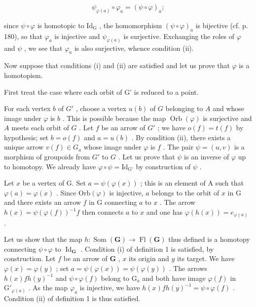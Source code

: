 \[
\psi_ {\varphi (a)} \circ \varphi_ {a} = (\psi \circ \varphi) _ {a};
\]

since \(\psi \circ \varphi\) is homotopic to \(\mathrm{Id}_{\mathrm{G}}\) , the homomorphism \((\psi \circ \varphi)_a\) is bijective (cf. p. 180), so that \(\varphi_a\) is injective and \(\psi_{\varphi(a)}\) is surjective. Exchanging the roles of \(\varphi\) and \(\psi\) , we see that \(\varphi_a\) is also surjective, whence condition (ii).

Now suppose that conditions (i) and (ii) are satisfied and let us prove that \(\varphi\) is a homotopism.

First treat the case where each orbit of G' is reduced to a point.

For each vertex \(b\) of \(G'\) , choose a vertex \(u(b)\) of \(G\) belonging to \(A\) and whose image under \(\varphi\) is \(b\) . This is possible because the map \(\operatorname{Orb}(\varphi)\) is surjective and \(A\) meets each orbit of \(G\) . Let \(f\) be an arrow of \(G'\) ; we have \(o(f) = t(f)\) by hypothesis; set \(b = o(f)\) and \(a = u(b)\) . By condition (ii), there exists a unique arrow \(v(f) \in G_a\) whose image under \(\varphi\) is \(f\) . The pair \(\psi = (u, v)\) is a morphism of groupoids from \(G'\) to \(G\) . Let us prove that \(\psi\) is an inverse of \(\varphi\) up to homotopy. We already have \(\varphi \circ \psi = \mathrm{Id}_{\mathrm{G}'}\) by construction of \(\psi\) .

Let \(x\) be a vertex of G. Set \(a = \psi(\varphi(x))\) ; this is an element of A such that \(\varphi(a) = \varphi(x)\) . Since \(\mathrm{Orb}(\varphi)\) is injective, \(a\) belongs to the orbit of \(x\) in G and there exists an arrow \(f\) in G connecting \(a\) to \(x\) . The arrow \(h(x) = \psi(\varphi(f))^{-1}f\) then connects \(a\) to \(x\) and one has \(\varphi(h(x)) = e_{\varphi(a)}\) .

Let us show that the map \(h \colon \operatorname{Som}(\mathbf{G}) \to \operatorname{Fl}(\mathbf{G})\) thus defined is a homotopy connecting \(\psi \circ \varphi\) to \(\operatorname{Id}_{\mathbf{G}}\) . Condition (i) of definition 1 is satisfied, by construction. Let \(f\) be an arrow of \(\mathbf{G}\) , \(x\) its origin and \(y\) its target. We have \(\varphi(x) = \varphi(y)\) ; set \(a = \psi(\varphi(x)) = \psi(\varphi(y))\) . The arrows \(h(x)fh(y)^{-1}\) and \(\psi \circ \varphi(f)\) belong to \(\mathrm{G}_a\) and both have image \(\varphi(f)\) in \(\mathrm{G}'_{\varphi(a)}\) . As the map \(\varphi_a\) is injective, we have \(h(x)fh(y)^{-1} = \psi \circ \varphi(f)\) . Condition (ii) of definition 1 is thus satisfied.

